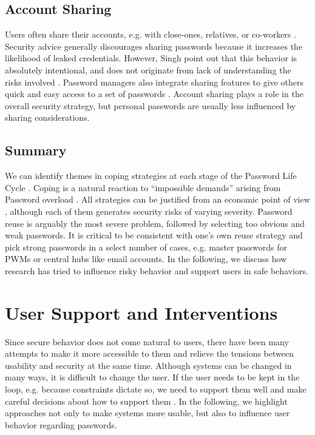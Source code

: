 	\subsection{Account Sharing}
	Users often share their accounts, e.g. with close-ones, relatives, or co-workers \cite{Kaye2011PasswordSharing, Shay2010EncounteringPasswordRequirements}. Security advice generally discourages sharing passwords because it increases the likelihood of leaked credentials. However, Singh \etal point out that this behavior is absolutely intentional, and does not originate from lack of understanding the risks involved \cite{Singh2007PasswordSharing}. Password managers also integrate sharing features to give others quick and easy access to a set of passwords \cite{Li2014EmperorsNewPWM}. Account sharing plays a role in the overall security strategy, but personal passwords are usually less influenced by sharing considerations. 

	\subsection{Summary}
	We can identify themes in coping strategies at each stage of the Password Life Cycle \cite{Stobert2014PasswordLifeCycle}. Coping is a natural reaction to ``impossible demands'' arising from Password overload \cite{Sasse2005UsableSecurityPosition}. All strategies can be justified from an economic point of view \cite{Florencio2014PasswordPortfoliosFiniteUser}, although each of them generates security risks of varying severity. Password reuse is arguably the most severe problem, followed by selecting too obvious and weak passwords. It is critical to be consistent with one's own reuse strategy and pick strong passwords in a select number of cases, e.g. master passwords for \glspl{PWM} or central hubs like email accounts. In the following, we discuss how research has tried to influence risky behavior and support users in safe behaviors. 

\section{User Support and Interventions}\label{sec:rw:user-support-interventions}
Since secure behavior does not come natural to users, there have been many attempts to make it more accessible to them and relieve the tensions between usability and security at the same time. Although systems can be changed in many ways, it is difficult to change the user. If the user needs to be kept in the loop, e.g. because constraints dictate so, we need to support them well and make careful decisions about how to support them \cite{Cranor2008FrameworkReasoning}. In the following, we highlight approaches not only to make systems more usable, but also to influence user behavior regarding passwords. 
